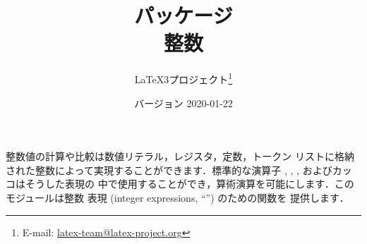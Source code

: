 \documentclass[dvipdfmx,full,kernel]{wtpl3doc}
\begin{document}
\title{パッケージ \\ 整数}
%
\author{%
 \LaTeX3プロジェクト\thanks
   {%
     E-mail:
       \href{mailto:latex-team@latex-project.org}
         {latex-team@latex-project.org}%
   }%
}
%
\date{バージョン 2020-01-22}
%
\maketitle
%
\begin{documentation}
%
%
整数値の計算や比較は数値リテラル，レジスタ，定数，トークン
リストに格納された整数によって実現することができます．標準的な演算子
\code{+}, \code{-}, \code{/}, \code{*}およびカッコはそうした表現の
中で使用することができ，算術演算を可能にします．このモジュールは整数
表現 (integer expressions, \enquote{}) のための関数を
提供します．
%
%

\end{documentation}
\end{document}
